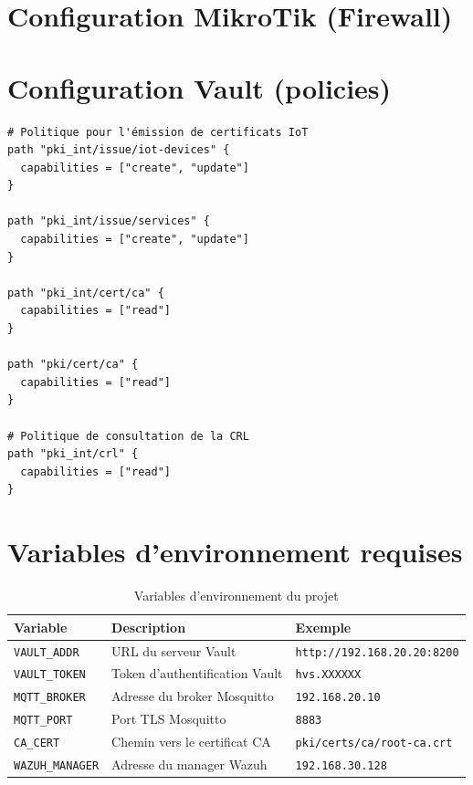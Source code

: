 \section{Configuration MikroTik (Firewall)}



\section{Configuration Vault (policies)}

\begin{lstlisting}[language=hcl, caption=pki-policy.hcl — Politique Vault pour l'émission de certificats]
# Politique pour l'émission de certificats IoT
path "pki_int/issue/iot-devices" {
  capabilities = ["create", "update"]
}

path "pki_int/issue/services" {
  capabilities = ["create", "update"]
}

path "pki_int/cert/ca" {
  capabilities = ["read"]
}

path "pki/cert/ca" {
  capabilities = ["read"]
}

# Politique de consultation de la CRL
path "pki_int/crl" {
  capabilities = ["read"]
}
\end{lstlisting}

\section{Variables d'environnement requises}

\begin{table}[H]
\centering
\caption{Variables d'environnement du projet}
\label{tab:env_vars}
\begin{tabular}{lll}
\toprule
\textbf{Variable} & \textbf{Description} & \textbf{Exemple} \\
\midrule
\texttt{VAULT\_ADDR} & URL du serveur Vault & \texttt{http://192.168.20.20:8200} \\
\texttt{VAULT\_TOKEN} & Token d'authentification Vault & \texttt{hvs.XXXXXX} \\
\texttt{MQTT\_BROKER} & Adresse du broker Mosquitto & \texttt{192.168.20.10} \\
\texttt{MQTT\_PORT} & Port TLS Mosquitto & \texttt{8883} \\
\texttt{CA\_CERT} & Chemin vers le certificat CA & \texttt{pki/certs/ca/root-ca.crt} \\
\texttt{WAZUH\_MANAGER} & Adresse du manager Wazuh & \texttt{192.168.30.128} \\
\bottomrule
\end{tabular}
\end{table}
